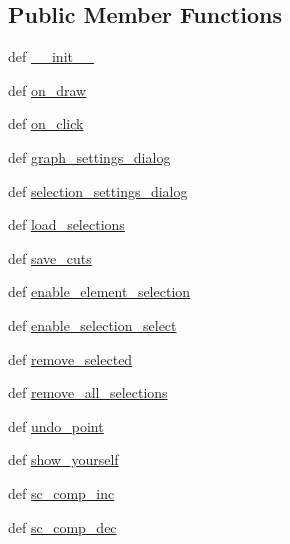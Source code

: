 \subsection*{Public Member Functions}
\begin{DoxyCompactItemize}
\item 
def \hyperlink{classWidgets_1_1MatplotlibTofeHistogramWidget_1_1MatplotlibHistogramWidget_aad6c4d8bd08361b82802043538c490cb}{\-\_\-\-\_\-init\-\_\-\-\_\-}
\item 
def \hyperlink{classWidgets_1_1MatplotlibTofeHistogramWidget_1_1MatplotlibHistogramWidget_ab339aa6fbf1a155bfa55e82408479827}{on\-\_\-draw}
\item 
def \hyperlink{classWidgets_1_1MatplotlibTofeHistogramWidget_1_1MatplotlibHistogramWidget_a6b99036e842a3a10d973a24beed195e4}{on\-\_\-click}
\item 
def \hyperlink{classWidgets_1_1MatplotlibTofeHistogramWidget_1_1MatplotlibHistogramWidget_a4511fc6ceba6077d9b77c7ebc5844589}{graph\-\_\-settings\-\_\-dialog}
\item 
def \hyperlink{classWidgets_1_1MatplotlibTofeHistogramWidget_1_1MatplotlibHistogramWidget_a867b89b1e7cffc519767f42aed7aa65d}{selection\-\_\-settings\-\_\-dialog}
\item 
def \hyperlink{classWidgets_1_1MatplotlibTofeHistogramWidget_1_1MatplotlibHistogramWidget_a0e05307e27790c3630d460c8f2324e53}{load\-\_\-selections}
\item 
def \hyperlink{classWidgets_1_1MatplotlibTofeHistogramWidget_1_1MatplotlibHistogramWidget_aba4b6470b436cfdebfafd4b22b77c2c1}{save\-\_\-cuts}
\item 
def \hyperlink{classWidgets_1_1MatplotlibTofeHistogramWidget_1_1MatplotlibHistogramWidget_ae50900b6a88cfc1f79e324b926524f69}{enable\-\_\-element\-\_\-selection}
\item 
def \hyperlink{classWidgets_1_1MatplotlibTofeHistogramWidget_1_1MatplotlibHistogramWidget_a77c4e39548829cecc7b24868da5c2ab7}{enable\-\_\-selection\-\_\-select}
\item 
def \hyperlink{classWidgets_1_1MatplotlibTofeHistogramWidget_1_1MatplotlibHistogramWidget_a29d44d21a1d4159302427c6194f2bcb1}{remove\-\_\-selected}
\item 
def \hyperlink{classWidgets_1_1MatplotlibTofeHistogramWidget_1_1MatplotlibHistogramWidget_a6582d98b8bfa9c935fc55d44956ae3ec}{remove\-\_\-all\-\_\-selections}
\item 
def \hyperlink{classWidgets_1_1MatplotlibTofeHistogramWidget_1_1MatplotlibHistogramWidget_a565fdecf97e86b1c7d815fa64a7fa436}{undo\-\_\-point}
\item 
def \hyperlink{classWidgets_1_1MatplotlibTofeHistogramWidget_1_1MatplotlibHistogramWidget_a452fba4272e9c97ec1ddcab3096a90a3}{show\-\_\-yourself}
\item 
def \hyperlink{classWidgets_1_1MatplotlibTofeHistogramWidget_1_1MatplotlibHistogramWidget_a82043cfec6ce431cac9a2b8a937318ae}{sc\-\_\-comp\-\_\-inc}
\item 
def \hyperlink{classWidgets_1_1MatplotlibTofeHistogramWidget_1_1MatplotlibHistogramWidget_a56ba65f0afd7c4d61ab4264fcb2f1987}{sc\-\_\-comp\-\_\-dec}
\end{DoxyCompactItemize}
